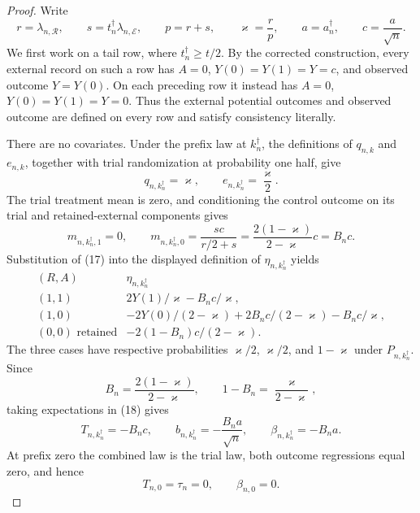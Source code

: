 \documentclass{article}
\begin{document}
\begin{proof}
Write
\[
 r=\lambda_{n,\mathcal R},\qquad
 s=t_n^{\dagger}\lambda_{n,\mathcal E},\qquad
 p=r+s,\qquad
 \varkappa=\frac rp,\qquad
 a=a_n^{\dagger},\qquad c=\frac a{\sqrt n}.
\tag{16}
\]
We first work on a tail row, where \(t_n^{\dagger}\geq t/2\).  By the corrected construction, every external record on such a row has \(A=0\), \(Y(0)=Y(1)=Y=c\), and observed outcome \(Y=Y(0)\).  On each preceding row it instead has \(A=0\), \(Y(0)=Y(1)=Y=0\).  Thus the external potential outcomes and observed outcome are defined on every row and satisfy consistency literally.

There are no covariates.  Under the prefix law at \(k_n^{\dagger}\), the definitions of \(q_{n,k}\) and \(e_{n,k}\), together with trial randomization at probability one half, give
\[
 q_{n,k_n^{\dagger}}=\varkappa,
 \qquad e_{n,k_n^{\dagger}}=\frac{\varkappa}{2}.
\]
The trial treatment mean is zero, and conditioning the control outcome on its trial and retained-external components gives
\[
 m_{n,k_n^{\dagger},1}=0,
 \qquad
 m_{n,k_n^{\dagger},0}
 =\frac{sc}{r/2+s}
 =\frac{2(1-\varkappa)}{2-\varkappa}c
 =B_nc.
\tag{17}
\]
Substitution of (17) into the displayed definition of \(\eta_{n,k_n^{\dagger}}\) yields
\[
\begin{array}{c|c}
(R,A)&\eta_{n,k_n^{\dagger}}\\ \hline
(1,1)&2Y(1)/\varkappa-B_nc/\varkappa,\\
(1,0)&-2Y(0)/(2-\varkappa)+2B_nc/(2-\varkappa)-B_nc/\varkappa,\\
(0,0)\text{ retained}&-2(1-B_n)c/(2-\varkappa).
\end{array}
\tag{18}
\]
The three cases have respective probabilities \(\varkappa/2\), \(\varkappa/2\), and \(1-\varkappa\) under \(P_{n,k_n^{\dagger}}\).  Since
\[
 B_n=\frac{2(1-\varkappa)}{2-\varkappa},
 \qquad 1-B_n=\frac{\varkappa}{2-\varkappa},
\]
taking expectations in (18) gives
\[
 T_{n,k_n^{\dagger}}=-B_nc,
 \qquad
 b_{n,k_n^{\dagger}}=-\frac{B_na}{\sqrt n},
 \qquad
 \beta_{n,k_n^{\dagger}}=-B_na.
\tag{19}
\]
At prefix zero the combined law is the trial law, both outcome regressions equal zero, and hence
\[
 T_{n,0}=\tau_n=0,\qquad \beta_{n,0}=0.
\tag{20}
\]


\end{proof}
\end{document}
